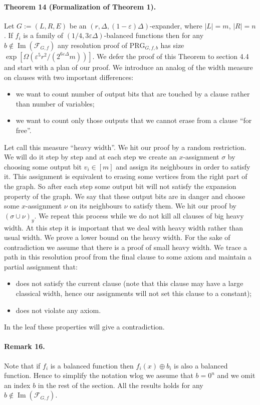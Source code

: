 \paragraph{Theorem 14 (Formalization of Theorem 1).} Let $G:=(L,R,E)$ be an $(r,\Delta,(1-\varepsilon)\Delta)$-expander, where $|L|=m$, $|R|=n$. If $f_i$ is a family of $(1/4,3\varepsilon\Delta)$-balanced functions then for any $b\notin\operatorname{Im}(\mathcal F_{G,f})$ any resolution proof of $\mathrm{PRG}_{G,f,b}$ has size $\exp[\Omega(\varepsilon^5r^2/(2^{6\varepsilon\Delta}m))]$.
We defer the proof of this Theorem to section 4.4 and start with a plan of our proof.
We introduce an analog of the width measure on clauses with two important differences:
\begin{itemize}
\item we want to count number of output bits that are touched by a clause rather than number of variables;
\item we want to count only those outputs that we cannot erase from a clause ``for free''.
\end{itemize}
Let call this measure ``heavy width''.
We hit our proof by a random restriction. We will do it step by step and at each step we create an $x$-assignment $\sigma$ by choosing some output bit $v_i\in[m]$ and assign its neighbours in order to satisfy it. This assignment is equivalent to erasing some vertices from the right part of the graph. So after each step some output bit will not satisfy the expansion property of the graph. We say that these output bits are in danger and choose some $x$-assignment $\nu$ on its neighbours to satisfy them. We hit our proof by $(\sigma\cup\nu)_y$.
We repeat this process while we do not kill all clauses of big heavy width. At this step it is important that we deal with heavy width rather than usual width.
We prove a lower bound on the heavy width. For the sake of contradiction we assume that there is a proof of small heavy width. We trace a path in this resolution proof from the final clause to some axiom and maintain a partial assignment that:
\begin{itemize}
\item does not satisfy the current clause (note that this clause may have a large classical width, hence our assignments will not set this clause to a constant);
\item does not violate any axiom.
\end{itemize}
In the leaf these properties will give a contradiction.
\paragraph{Remark 16.} Note that if $f_i$ is a balanced function then $f_i(x)\oplus b_i$ is also a balanced function. Hence to simplify the notation wlog we assume that $b=0^n$ and we omit an index $b$ in the rest of the section. All the results holds for any $b\notin\operatorname{Im}(\mathcal F_{G,f})$.

